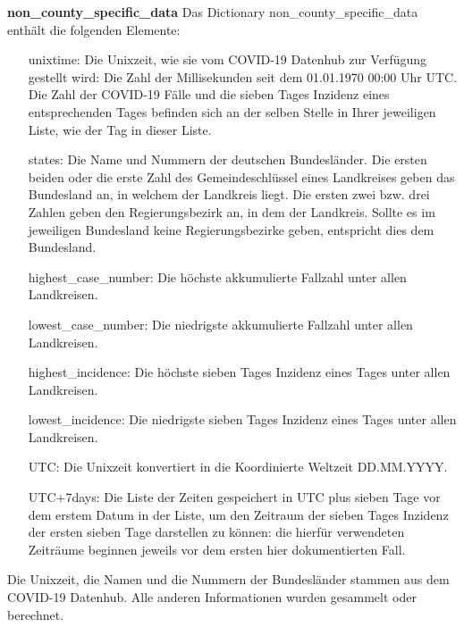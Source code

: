 \textbf{non\_county\_specific\_data}
Das Dictionary non\_county\_specific\_data enthält die folgenden Elemente:
\begin{itemize}
    \item[unixtime:] Die Unixzeit, wie sie vom COVID-19 Datenhub zur Verfügung gestellt wird: Die Zahl der Millisekunden seit dem 01.01.1970 00:00 Uhr UTC. Die Zahl der COVID-19 Fälle und die sieben Tages Inzidenz eines entsprechenden Tages befinden sich an der selben Stelle in Ihrer jeweiligen Liste, wie der Tag in dieser Liste.
    \item[states:] Die Name und Nummern der deutschen Bundesländer. Die ersten beiden oder die erste Zahl des Gemeindeschlüssel eines Landkreises geben das Bundesland an, in welchem der Landkreis liegt. Die ersten zwei bzw. drei Zahlen geben den Regierungsbezirk an, in dem der Landkreis. Sollte es im jeweiligen Bundesland keine Regierungsbezirke geben, entspricht dies dem Bundesland.
    \item[highest\_case\_number:] Die höchste akkumulierte Fallzahl unter allen Landkreisen.
    \item[lowest\_case\_number:] Die niedrigste akkumulierte Fallzahl unter allen Landkreisen.
    \item[highest\_incidence:] Die höchste sieben Tages Inzidenz eines Tages unter allen Landkreisen.
    \item[lowest\_incidence:] Die niedrigste sieben Tages Inzidenz eines Tages unter allen Landkreisen.
    \item[UTC:] Die Unixzeit konvertiert in die Koordinierte Weltzeit \glqq{}DD.MM.YYYY\grqq{}.
    \item[UTC+7days:] Die Liste der Zeiten gespeichert in UTC plus sieben Tage vor dem erstem Datum in der Liste, um den Zeitraum der sieben Tages Inzidenz der ersten sieben Tage darstellen zu können: die hierfür verwendeten Zeiträume beginnen jeweils vor dem ersten hier dokumentierten Fall.
\end{itemize}
Die Unixzeit, die Namen und die Nummern der Bundesländer stammen aus dem \glqq{}COVID-19 Datenhub\grqq{}. Alle anderen Informationen wurden gesammelt oder berechnet.

